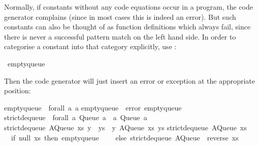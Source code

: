 \begin{isabellebody}
\begin{isamarkuptext}
  Normally, if constants without any code equations occur in a
  program, the code generator complains (since in most cases this is
  indeed an error).  But such constants can also be thought
  of as function definitions which always fail,
  since there is never a successful pattern match on the left hand
  side.  In order to categorise a constant into that category
  explicitly, use \hypertarget{command.code-abort}{\hyperlink{command.code-abort}{\mbox{}}}:%
\end{isamarkuptext}%
\isamarkuptrue%
%
\isadelimquote
%
\endisadelimquote
%
\isatagquote
{}\isamarkupfalse%
\ empty{\isacharunderscore}queue%
\endisatagquote
{\isafoldquote}%
%
\isadelimquote
%
\endisadelimquote
%
\begin{isamarkuptext}%
\noindent Then the code generator will just insert an error or
  exception at the appropriate position:%
\end{isamarkuptext}%
\isamarkuptrue%
%
\isadelimquote
%
\endisadelimquote
%
\isatagquote
%
\begin{isamarkuptext}%
\begin{typewriter}
    empty{\isacharunderscore}queue\ {\isacharcolon}{\isacharcolon}\ forall\ a{\isachardot}\ a{\isacharsemicolon}\isanewline
empty{\isacharunderscore}queue\ {\isacharequal}\ error\ {\isachardoublequote}empty{\isacharunderscore}queue{\isachardoublequote}{\isacharsemicolon}\isanewline
\isanewline
strict{\isacharunderscore}dequeue\ {\isacharcolon}{\isacharcolon}\ forall\ a{\isachardot}\ Queue\ a\ {\isacharminus}{\isachargreater}\ {\isacharparenleft}a{\isacharcomma}\ Queue\ a{\isacharparenright}{\isacharsemicolon}\isanewline
strict{\isacharunderscore}dequeue\ {\isacharparenleft}AQueue\ xs\ {\isacharparenleft}y\ {\isacharcolon}\ ys{\isacharparenright}{\isacharparenright}\ {\isacharequal}\ {\isacharparenleft}y{\isacharcomma}\ AQueue\ xs\ ys{\isacharparenright}{\isacharsemicolon}\isanewline
strict{\isacharunderscore}dequeue\ {\isacharparenleft}AQueue\ xs\ {\isacharbrackleft}{\isacharbrackright}{\isacharparenright}\ {\isacharequal}\isanewline
\ \ {\isacharparenleft}if\ null\ xs\ then\ empty{\isacharunderscore}queue\isanewline
\ \ \ \ else\ strict{\isacharunderscore}dequeue\ {\isacharparenleft}AQueue\ {\isacharbrackleft}{\isacharbrackright}\ {\isacharparenleft}reverse\ xs{\isacharparenright}{\isacharparenright}{\isacharparenright}{\isacharsemicolon}
  \end{typewriter}%
\end{isamarkuptext}%

\end{isabellebody}
